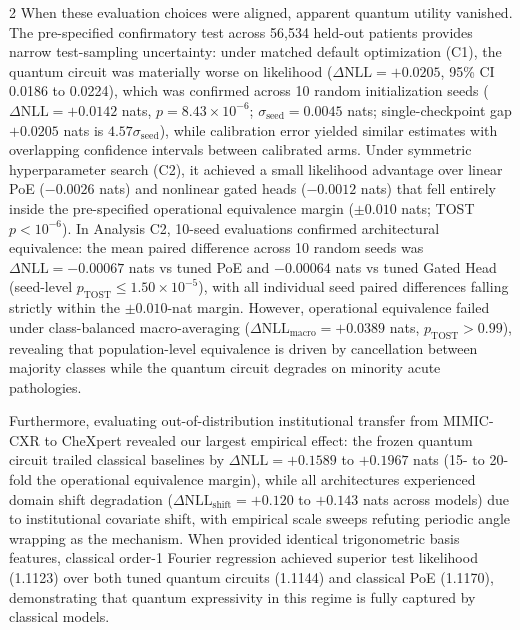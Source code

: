 \documentclass[10pt,a4paper,twoside]{article}
\begin{document}
\begin{multicols}{2}
When these evaluation choices were aligned, apparent quantum utility vanished. The pre-specified confirmatory test across 56,534 held-out patients provides narrow test-sampling uncertainty: under matched default optimization (C1), the quantum circuit was materially worse on likelihood ($\Delta\text{NLL} = +0.0205$, 95\% CI 0.0186 to 0.0224), which was confirmed across 10 random initialization seeds ($\Delta\text{NLL} = +0.0142$ nats, $p = 8.43 \times 10^{-6}$; $\sigma_{\text{seed}} = 0.0045$ nats; single-checkpoint gap $+0.0205$ nats is $4.57\sigma_{\text{seed}}$), while calibration error yielded similar estimates with overlapping confidence intervals between calibrated arms. Under symmetric hyperparameter search (C2), it achieved a small likelihood advantage over linear PoE ($-0.0026$ nats) and nonlinear gated heads ($-0.0012$ nats) that fell entirely inside the pre-specified operational equivalence margin ($\pm 0.010$ nats; TOST $p < 10^{-6}$). In Analysis C2, 10-seed evaluations confirmed architectural equivalence: the mean paired difference across 10 random seeds was $\Delta\text{NLL} = -0.00067$ nats vs tuned PoE and $-0.00064$ nats vs tuned Gated Head (seed-level $p_{\text{TOST}} \le 1.50 \times 10^{-5}$), with all individual seed paired differences falling strictly within the $\pm 0.010$-nat margin. However, operational equivalence failed under class-balanced macro-averaging ($\Delta\text{NLL}_{\text{macro}} = +0.0389$ nats, $p_{\text{TOST}} > 0.99$), revealing that population-level equivalence is driven by cancellation between majority classes while the quantum circuit degrades on minority acute pathologies.

Furthermore, evaluating out-of-distribution institutional transfer from MIMIC-CXR to CheXpert revealed our largest empirical effect: the frozen quantum circuit trailed classical baselines by $\Delta\text{NLL} = \mathbf{+0.1589}$ to $\mathbf{+0.1967}$ nats (15- to 20-fold the operational equivalence margin), while all architectures experienced domain shift degradation ($\Delta\text{NLL}_{\text{shift}} = +0.120$ to $+0.143$ nats across models) due to institutional covariate shift, with empirical scale sweeps refuting periodic angle wrapping as the mechanism. When provided identical trigonometric basis features, classical order-1 Fourier regression achieved superior test likelihood (1.1123) over both tuned quantum circuits (1.1144) and classical PoE (1.1170), demonstrating that quantum expressivity in this regime is fully captured by classical models.


\end{multicols}
\end{document}

